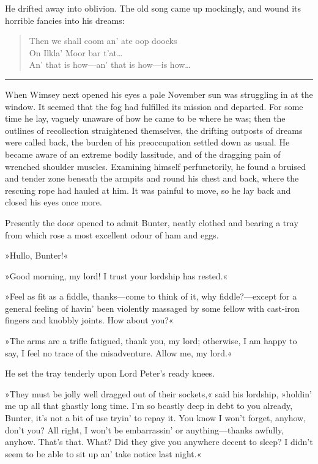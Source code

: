 He drifted away into oblivion. The old song came up mockingly, and wound its horrible fancies into his dreams: 

\begin{verse}
\begin{altverse}
Then we shall coom an' ate oop doocks\\
On Ilkla' Moor bar t'at\dots\\
An' that is how—{\small an' that is how—}{\footnotesize is how\dots}\\
\end{altverse}
\end{verse}

\noindent\hfil\rule{0.5\textwidth}{.4pt}\hfil 

When Wimsey next opened his eyes a pale November sun was struggling in at the window. It seemed that the fog had fulfilled its mission and departed. For some time he lay, vaguely unaware of how he came to be where he was; then the outlines of recollection straightened themselves, the drifting outposts of dreams were called back, the burden of his preoccupation settled down as usual. He became aware of an extreme bodily lassitude, and of the dragging pain of wrenched shoulder muscles. Examining himself perfunctorily, he found a bruised and tender zone beneath the armpits and round his chest and back, where the rescuing rope had hauled at him. It was painful to move, so he lay back and closed his eyes once more.

Presently the door opened to admit Bunter, neatly clothed and bearing a tray from which rose a most excellent odour of ham and eggs.

»Hullo, Bunter!«

»Good morning, my lord! I trust your lordship has rested.«

»Feel as fit as a fiddle, thanks—come to think of it, why fiddle?—except for a general feeling of havin' been violently massaged by some fellow with cast-iron fingers and knobbly joints. How about you?«

»The arms are a trifle fatigued, thank you, my lord; otherwise, I am happy to say, I feel no trace of the misadventure. Allow me, my lord.«

He set the tray tenderly upon Lord Peter's ready knees.

»They must be jolly well dragged out of their sockets,« said his lordship, »holdin' me up all that ghastly long time. I'm so beastly deep in debt to you already, Bunter, it's not a bit of use tryin' to repay it. You know I won't forget, anyhow, don't you? All right, I won't be embarrassin' or anything—thanks awfully, anyhow. That's that.  What? Did they give you anywhere decent to sleep? I didn't seem to be able to sit up an' take notice last night.«


